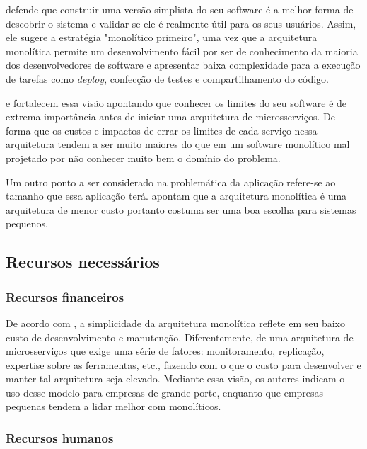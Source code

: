  defende que construir uma versão simplista do seu software é
a melhor forma de descobrir o sistema e validar se ele é realmente útil para os seus usuários.
Assim, ele sugere a estratégia "monolítico primeiro", uma vez que a arquitetura monolítica permite
um desenvolvimento fácil por ser de conhecimento da maioria dos desenvolvedores de software e
apresentar baixa complexidade para a execução de tarefas como \textit{deploy}, confecção de testes
e compartilhamento do código.

 e  fortalecem essa visão apontando
que conhecer os limites do seu software é de extrema importância antes de iniciar uma arquitetura de
microsserviços. De forma que os custos e impactos de errar os limites de cada serviço nessa arquitetura
tendem a ser muito maiores do que em um software monolítico mal projetado por não conhecer muito bem o
domínio do problema. 

Um outro ponto a ser considerado na problemática da aplicação refere-se ao tamanho que essa
aplicação terá.  apontam que a arquitetura
monolítica é uma arquitetura de menor custo portanto costuma ser uma boa escolha para sistemas
pequenos.

\subsection{Recursos necessários}

\subsubsection{Recursos financeiros}
\label{Perspectivas:recursosFinanceiros}

De acordo com , a simplicidade da arquitetura
monolítica reflete em seu baixo custo de desenvolvimento e manutenção. Diferentemente, de uma arquitetura
de microsserviços que exige uma série de fatores: monitoramento, replicação, expertise sobre as
ferramentas, etc., fazendo com o que o custo para desenvolver e manter tal arquitetura seja elevado.
Mediante essa visão, os autores indicam o uso desse modelo para empresas de grande porte,
enquanto que empresas pequenas tendem a lidar melhor com monolíticos.

\subsubsection{Recursos humanos}
\label{Perspectivas:recursosHumanos}

